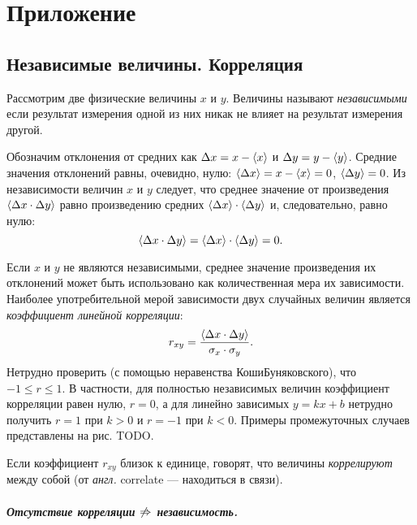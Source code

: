 \chapter{Приложение}

\small

\section{Независимые величины. Корреляция}

Рассмотрим две физические величины $x$ и $y$. Величины называют
\emph{независимыми} если результат измерения одной из них никак не
влияет на результат измерения другой.

Обозначим отклонения от средних как $\Delta x=x-\left<x\right>$ и $\Delta
y=y-\left<y\right>$.
Средние значения отклонений равны, очевидно, нулю: $\left<\Delta
x\right>=x-\left<x\right>=0$,
$\left<\Delta y\right>=0$. Из независимости величин $x$ и $y$ следует,
что среднее значение от произведения $\left<\Delta x\cdot\Delta y\right>$
равно произведению средних $\left<\Delta x\right>\cdot\left<\Delta y\right>$
и, следовательно, равно нулю:
\begin{equation}
\left<\Delta x\cdot\Delta y\right>=\left<\Delta x\right>\cdot\left<\Delta
y\right>=0.\label{eq:indep}
\end{equation}

Если $x$ и $y$ не являются независимыми, среднее значение произведения
их отклонений может быть использовано как количественная мера их зависимости.
Наиболее употребительной мерой зависимости двух случайных величин
является \emph{коэффициент линейной корреляции}:
\begin{equation}
r_{xy}=\frac{\left<\Delta x\cdot\Delta
y\right>}{\sigma_{x}\cdot\sigma_{y}}.\label{eq:pearson}
\end{equation}
Нетрудно проверить (с помощью неравенства Коши\textendash Буняковского),
что $-1\le r\le1$. В частности, для полностью независимых величин
коэффициент корреляции равен нулю, $r=0$, а для линейно зависимых
$y=kx+b$ нетрудно получить $r=1$ при $k>0$ и $r=-1$ при $k<0$.
Примеры промежуточных случаев представлены на рис. TODO.

Если коэффициент $r_{xy}$ близок к единице, говорят, что величины
\emph{коррелируют} между собой (от \emph{англ.} correlate ---
находиться в связи).

\paragraph{Отсутствие корреляции $\protect\not\Rightarrow$ независимость.}

